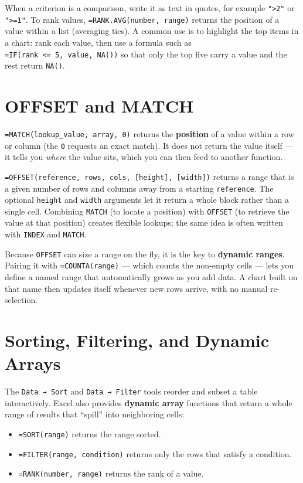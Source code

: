 \documentclass[
  11pt,
  letterpaper,
  DIV=11,
  numbers=noendperiod,
  oneside,
  open=any]{scrreprt}
\providecommand{\tightlist}{%
  \setlength{\itemsep}{0pt}\setlength{\parskip}{0pt}}\usepackage{longtable,booktabs,array}
\begin{document}
When a criterion is a comparison, write it as text in quotes, for
example \texttt{"\textgreater{}2"} or \texttt{"\textgreater{}=1"}. To
rank values, \texttt{=RANK.AVG(number,\ range)} returns the position of
a value within a list (averaging ties). A common use is to highlight the
top items in a chart: rank each value, then use a formula such as
\texttt{=IF(rank\ \textless{}=\ 5,\ value,\ NA())} so that only the top
five carry a value and the rest return \texttt{NA()}.

\section{OFFSET and MATCH}\label{offset-and-match}

\texttt{=MATCH(lookup\_value,\ array,\ 0)} returns the \textbf{position}
of a value within a row or column (the \texttt{0} requests an exact
match). It does not return the value itself --- it tells you
\emph{where} the value sits, which you can then feed to another
function.

\texttt{=OFFSET(reference,\ rows,\ cols,\ {[}height{]},\ {[}width{]})}
returns a range that is a given number of rows and columns away from a
starting \texttt{reference}. The optional \texttt{height} and
\texttt{width} arguments let it return a whole block rather than a
single cell. Combining \texttt{MATCH} (to locate a position) with
\texttt{OFFSET} (to retrieve the value at that position) creates
flexible lookups; the same idea is often written with \texttt{INDEX} and
\texttt{MATCH}.

Because \texttt{OFFSET} can size a range on the fly, it is the key to
\textbf{dynamic ranges}. Pairing it with \texttt{=COUNTA(range)} ---
which counts the non-empty cells --- lets you define a named range that
automatically grows as you add data. A chart built on that name then
updates itself whenever new rows arrive, with no manual re-selection.

\section{Sorting, Filtering, and Dynamic
Arrays}\label{sorting-filtering-and-dynamic-arrays}

The \texttt{Data\ →\ Sort} and \texttt{Data\ →\ Filter} tools reorder
and subset a table interactively. Excel also provides \textbf{dynamic
array} functions that return a whole range of results that ``spill''
into neighboring cells:

\begin{itemize}
\tightlist
\item
  \texttt{=SORT(range)} returns the range sorted.
\item
  \texttt{=FILTER(range,\ condition)} returns only the rows that satisfy
  a condition.
\item
  \texttt{=RANK(number,\ range)} returns the rank of a value.
\end{itemize}
\end{document}
